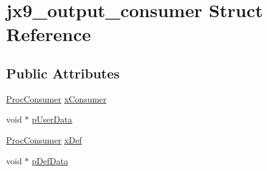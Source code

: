 \hypertarget{structjx9__output__consumer}{\section{jx9\-\_\-output\-\_\-consumer Struct Reference}
\label{d4/db5/structjx9__output__consumer}
}
\subsection*{Public Attributes}
\begin{DoxyCompactItemize}
\item 
\hyperlink{unqlite_8h_a23e329c5ae3c9a3233492de42393c93c}{Proc\-Consumer} \hyperlink{structjx9__output__consumer_a6859bf5fccf2c1b8f4c93a81810a6f30}{x\-Consumer}
\item 
void $\ast$ \hyperlink{structjx9__output__consumer_a8370c979af9358b311d641763d47bce1}{p\-User\-Data}
\item 
\hyperlink{unqlite_8h_a23e329c5ae3c9a3233492de42393c93c}{Proc\-Consumer} \hyperlink{structjx9__output__consumer_a6a0ad0d53bcb945dfa1cf8da091c707e}{x\-Def}
\item 
void $\ast$ \hyperlink{structjx9__output__consumer_a36bd3aff6d78c0718d70e5def6ca31e9}{p\-Def\-Data}
\end{DoxyCompactItemize}


